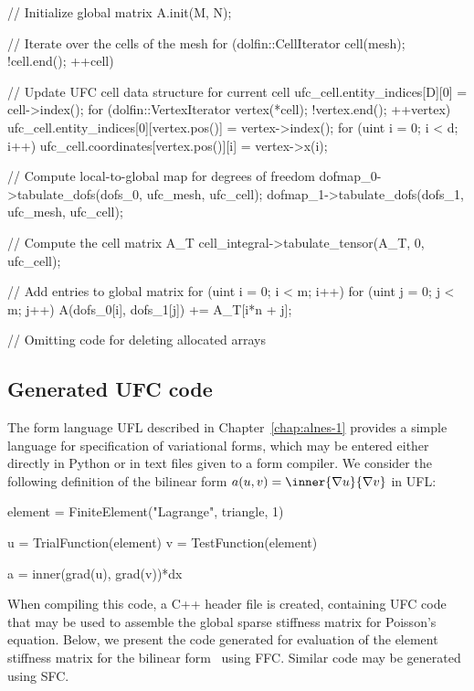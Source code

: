 \begin{c++}
{  // Initialize global matrix
  A.init(M, N);

  // Iterate over the cells of the mesh
  for (dolfin::CellIterator cell(mesh); !cell.end(); ++cell)
  {
    // Update UFC cell data structure for current cell
    ufc_cell.entity_indices[D][0] = cell->index();
    for (dolfin::VertexIterator vertex(*cell); !vertex.end(); ++vertex)
    {
      ufc_cell.entity_indices[0][vertex.pos()] = vertex->index();
      for (uint i = 0; i < d; i++)
        ufc_cell.coordinates[vertex.pos()][i] = vertex->x(i);
    }

    // Compute local-to-global map for degrees of freedom
    dofmap_0->tabulate_dofs(dofs_0, ufc_mesh, ufc_cell);
    dofmap_1->tabulate_dofs(dofs_1, ufc_mesh, ufc_cell);

    // Compute the cell matrix A_T
    cell_integral->tabulate_tensor(A_T, 0, ufc_cell);

    // Add entries to global matrix
    for (uint i = 0; i < m; i++)
      for (uint j = 0; j < m; j++)
        A(dofs_0[i], dofs_1[j]) += A_T[i*n + j];
  }

  // Omitting code for deleting allocated arrays
}
\end{c++}

\subsection{Generated UFC code}

The form language UFL described in Chapter~\ref{chap:alnes-1} provides
a simple language for specification of variational forms, which may be
entered either directly in Python or in text files given to a form
compiler.  We consider the following definition of the bilinear form
$a(u, v) = \inner{\nabla u}{\nabla v}$ in UFL:
\begin{uflcode}
element = FiniteElement("Lagrange", triangle, 1)

u = TrialFunction(element)
v = TestFunction(element)

a = inner(grad(u), grad(v))*dx
\end{uflcode}

When compiling this code, a C++ header file is created, containing UFC
code that may be used to assemble the global sparse stiffness matrix
for Poisson's equation. Below, we present the code generated for
evaluation of the element stiffness matrix for the bilinear
form~ using FFC. Similar code may be generated using SFC.


